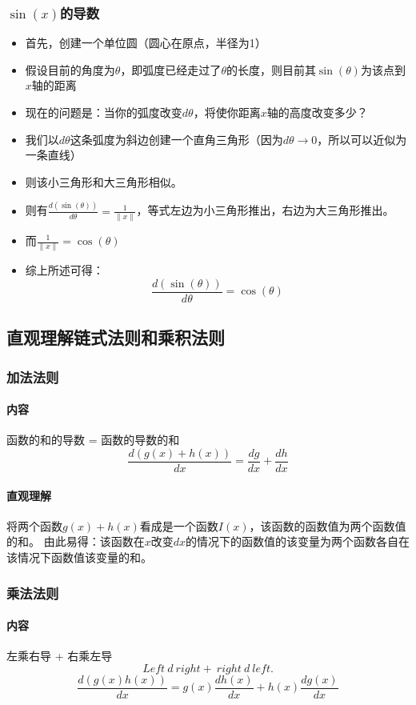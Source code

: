 \documentclass[UTF8]{ctexart}
\begin{document}
\subsubsection{$\sin(x)$的导数}
\begin{itemize}
	\item 首先，创建一个单位圆（圆心在原点，半径为1）
	\item 假设目前的角度为$\theta$，即弧度已经走过了$\theta$的长度，则目前其$\sin(\theta)$为该点到$x$轴的距离
	\item 现在的问题是：当你的弧度改变$d\theta$，将使你距离$x$轴的高度改变多少？
	\item 我们以$d\theta$这条弧度为斜边创建一个直角三角形（因为$d\theta\to0$，所以可以近似为一条直线）
	\item 则该小三角形和大三角形相似。
	\item 则有$\frac{d(\sin(\theta))}{d\theta} = \frac{1}{\|x\|}$，等式左边为小三角形推出，右边为大三角形推出。
	\item 而$\frac{1}{\|x\|} = \cos(\theta)$
	\item 综上所述可得：$$\frac{d(\sin(\theta))}{d\theta} = \cos(\theta)$$
\end{itemize}

\subsection{直观理解链式法则和乘积法则}
\subsubsection{加法法则}
\paragraph{内容}
函数的和的导数 = 函数的导数的和
$$\frac{d(g(x) + h(x))}{dx} = \frac{dg}{dx} + \frac{dh}{dx}$$
\paragraph{直观理解}
将两个函数$g(x) + h(x)$看成是一个函数$I(x)$，该函数的函数值为两个函数值的和。
由此易得：该函数在$x$改变$dx$的情况下的函数值的该变量为两个函数各自在该情况下函数值该变量的和。

\subsubsection{乘法法则}
\paragraph{内容}
左乘右导 + 右乘左导
$$Left\ d\ right + \ right\ d\ left.$$
$$\frac{d(g(x)h(x))}{dx} = g(x)\frac{dh(x)}{dx} + h(x)\frac{dg(x)}{dx}$$
\end{document}
